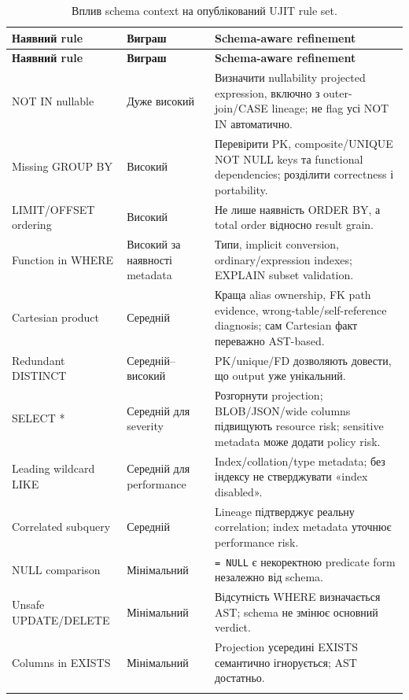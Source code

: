 \documentclass[11pt,a4paper]{article}
\begin{document}
\begin{longtable}{>{\raggedright\arraybackslash}p{3.5cm}
                  >{\raggedright\arraybackslash}p{2.7cm}
                  >{\raggedright\arraybackslash}p{7.6cm}}
\toprule
\textbf{Наявний rule} & \textbf{Виграш} & \textbf{Schema-aware refinement} \\
\midrule
\endfirsthead
\toprule
\textbf{Наявний rule} & \textbf{Виграш} & \textbf{Schema-aware refinement} \\
\midrule
\endhead
NOT IN nullable & Дуже високий &
Визначити nullability projected expression, включно з outer-join/CASE lineage;
не flag усі NOT IN автоматично. \\
Missing GROUP BY & Високий &
Перевірити PK, composite/UNIQUE NOT NULL keys та functional dependencies;
розділити correctness і portability. \\
LIMIT/OFFSET ordering & Високий &
Не лише наявність ORDER BY, а total order відносно result grain. \\
Function in WHERE & Високий за наявності metadata &
Типи, implicit conversion, ordinary/expression indexes; EXPLAIN subset validation. \\
Cartesian product & Середній &
Краща alias ownership, FK path evidence, wrong-table/self-reference diagnosis;
сам Cartesian факт переважно AST-based. \\
Redundant DISTINCT & Середній--високий &
PK/unique/FD дозволяють довести, що output уже унікальний. \\
SELECT * & Середній для severity &
Розгорнути projection; BLOB/JSON/wide columns підвищують resource risk;
sensitive metadata може додати policy risk. \\
Leading wildcard LIKE & Середній для performance &
Index/collation/type metadata; без індексу не стверджувати «index disabled». \\
Correlated subquery & Середній &
Lineage підтверджує реальну correlation; index metadata уточнює performance risk. \\
NULL comparison & Мінімальний &
\texttt{= NULL} є некоректною predicate form незалежно від schema. \\
Unsafe UPDATE/DELETE & Мінімальний &
Відсутність WHERE визначається AST; schema не змінює основний verdict. \\
Columns in EXISTS & Мінімальний &
Projection усередині EXISTS семантично ігнорується; AST достатньо. \\
\bottomrule
\caption{Вплив schema context на опублікований UJIT rule set.}
\end{longtable}
\end{document}
